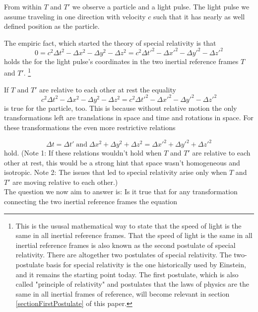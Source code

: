 \documentclass{article}
\begin{document}
From within $T$ and $T'$ we observe a particle and a light pulse.
The light pulse we assume traveling in one direction with velocity $c$ such that it has nearly as well defined position as the particle.

The empiric fact, which started the theory of special relativity is that
\begin{equation} \label{constantsSpeedOfLight}
0 = c^2\Delta t^2 - \Delta x^2 - \Delta y^2 - \Delta z^2 = c^2\Delta t'^2 - \Delta x'^2 - \Delta y'^2 - \Delta z'^2
\end{equation}
holds the for the light pulse's coordinates in the two inertial reference frames $T$ and $T'$.
\footnote{This is the ususal mathematical way to state that the speed of light is the same in all inertial reference frames.
That the speed of light is the same in all inertial reference frames is also known as the second postulate of special relativity.
There are altogether two postulates of special relativity.
The two-postulate basis for special relativity is the one historically used by Einstein, and it remains the starting point today.
The first postulate, which is also called "principle of relativity" and postulates that the laws of physics are the same in all inertial frames of reference,
will become relevant in section \ref{sectionFirstPostulate} of this paper.}


If $T$ and $T'$ are relative to each other at rest the equality
\begin{equation}
c^2\Delta t^2 - \Delta x^2 - \Delta y^2 - \Delta z^2 = c^2\Delta t'^2 - \Delta x'^2 - \Delta y'^2 - \Delta z'^2
\end{equation}
is true for the particle, too.
This is because without relative motion the only transformations left are translations in space and time and rotations in space.
For these transformations the even more restrictive relations

\begin{equation} \label{noVelocityTransform}
\Delta t = \Delta t' \; \text{and} \; \Delta x^2 + \Delta y^2 + \Delta z^2 = \Delta x'^2 + \Delta y'^2 + \Delta z'^2
\end{equation}
hold. (Note 1: If these relations wouldn't hold when $T$ and $T'$ are relative to each other at rest, this would be a strong hint that space wasn't homogeneous and isotropic.
Note 2: The issues that led to special relativity arise only when $T$ and $T'$ are moving relative to each other.)\\

The question we now aim to answer is: Is it true that for any transformation connecting the two inertial reference frames the equation
\end{document}
